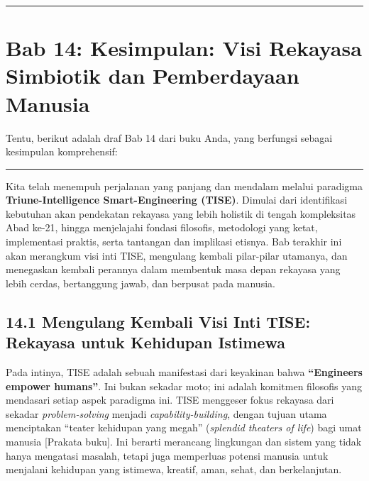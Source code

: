 \documentclass[
  letterpaper,
  DIV=11,
  numbers=noendperiod]{scrreprt}
\begin{document}
\begin{center}\rule{0.5\linewidth}{0.5pt}\end{center}


\chapter{\texorpdfstring{\textbf{Bab 14: Kesimpulan: Visi Rekayasa
Simbiotik dan Pemberdayaan
Manusia}}{Bab 14: Kesimpulan: Visi Rekayasa Simbiotik dan Pemberdayaan Manusia}}\label{bab-14-kesimpulan-visi-rekayasa-simbiotik-dan-pemberdayaan-manusia}

Tentu, berikut adalah draf Bab 14 dari buku Anda, yang berfungsi sebagai
kesimpulan komprehensif:

\begin{center}\rule{0.5\linewidth}{0.5pt}\end{center}

Kita telah menempuh perjalanan yang panjang dan mendalam melalui
paradigma \textbf{Triune-Intelligence Smart-Engineering (TISE)}. Dimulai
dari identifikasi kebutuhan akan pendekatan rekayasa yang lebih holistik
di tengah kompleksitas Abad ke-21, hingga menjelajahi fondasi filosofis,
metodologi yang ketat, implementasi praktis, serta tantangan dan
implikasi etisnya. Bab terakhir ini akan merangkum visi inti TISE,
mengulang kembali pilar-pilar utamanya, dan menegaskan kembali perannya
dalam membentuk masa depan rekayasa yang lebih cerdas, bertanggung
jawab, dan berpusat pada manusia.

\section{\texorpdfstring{\textbf{14.1 Mengulang Kembali Visi Inti TISE:
Rekayasa untuk Kehidupan
Istimewa}}{14.1 Mengulang Kembali Visi Inti TISE: Rekayasa untuk Kehidupan Istimewa}}\label{mengulang-kembali-visi-inti-tise-rekayasa-untuk-kehidupan-istimewa}

Pada intinya, TISE adalah sebuah manifestasi dari keyakinan bahwa
\textbf{``Engineers empower humans''}. Ini bukan sekadar moto; ini
adalah komitmen filosofis yang mendasari setiap aspek paradigma ini.
TISE menggeser fokus rekayasa dari sekadar \emph{problem-solving}
menjadi \emph{capability-building}, dengan tujuan utama menciptakan
``teater kehidupan yang megah'' (\emph{splendid theaters of life}) bagi
umat manusia {[}Prakata buku{]}. Ini berarti merancang lingkungan dan
sistem yang tidak hanya mengatasi masalah, tetapi juga memperluas
potensi manusia untuk menjalani kehidupan yang istimewa, kreatif, aman,
sehat, dan berkelanjutan.
\end{document}
